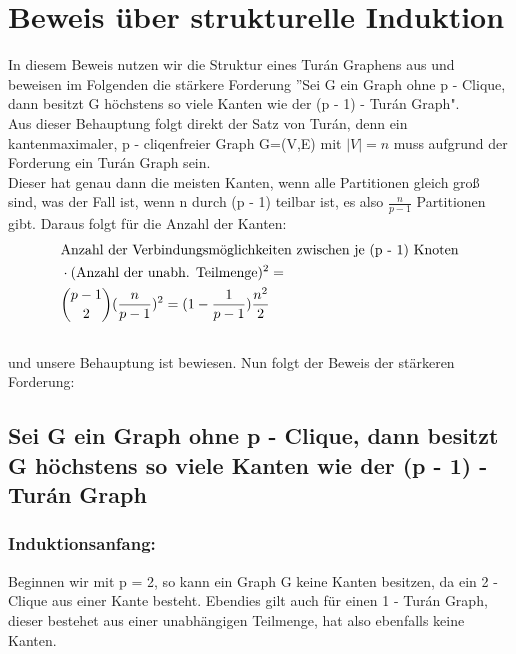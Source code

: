 \documentclass[12pt, a4paper]{article}
\begin{document}
\section{Beweis über strukturelle Induktion}
\label{proof/second:zweiter-beweis-struktur-des-turan-graphs}\label{proof/second::doc}
In diesem Beweis nutzen wir die Struktur eines Turán Graphens aus und beweisen im Folgenden die stärkere Forderung ''Sei G ein Graph ohne p - Clique, dann besitzt G höchstens so viele Kanten wie der (p - 1) - Turán Graph". \\
Aus dieser Behauptung folgt direkt der Satz von Turán, denn ein kantenmaximaler, p - cliqenfreier Graph G=(V,E) mit $\mid V \mid = n$ muss aufgrund der Forderung ein Turán Graph sein. \\
Dieser hat genau dann die meisten Kanten, wenn alle Partitionen gleich groß sind, was der Fall ist, wenn n durch (p - 1) teilbar ist, es also $\frac{n}{p-1}$ Partitionen gibt. Daraus folgt für die Anzahl der Kanten:
\begin{gather}
\begin{split}&\text{Anzahl der Verbindungsmöglichkeiten zwischen je (p - 1) Knoten} \\
&\cdot ( \text{Anzahl der unabh. Teilmenge} )^2 = \\ &{ p - 1 \choose 2 } ( \frac{n}{p-1} )^2 = (1 - \frac{1}{p - 1}) \frac{n^2}{2}\end{split}\notag\\\begin{split}\end{split}\notag
\end{gather}
und unsere Behauptung ist bewiesen. Nun folgt der Beweis der stärkeren Forderung:


\subsection{Sei G ein Graph ohne p - Clique, dann besitzt G höchstens so viele Kanten wie der (p - 1) - Turán Graph}
\label{proof/second:sei-g-ein-graph-ohne-p-clique-dann-besitzt-g-hochstens-so-viele-kanten-wie-der-p-1-turan-graph}
\subsubsection{Induktionsanfang:}

Beginnen wir mit p = 2, so kann ein Graph G keine Kanten besitzen, da ein 2 - Clique aus einer Kante besteht. Ebendies gilt auch für einen 1 - Turán Graph, dieser bestehet aus einer unabhängigen Teilmenge, hat also ebenfalls keine Kanten. 
\end{document}
